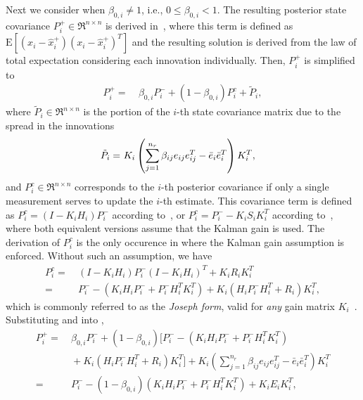 Next we consider when $\beta_{0,i}\neq1$, i.e., $0\leq\beta_{0,i}<1$.
The resulting posterior state covariance $P^+_{i}\in\Re^{n\times n}$ is derived in~\cite[Eq. D-32 and D-33]{TrackDataAssoc}, where this term is defined as $\text{E}[(x_i-\hat x_i^+)(x_i-\hat x_i^+)^T]$ and the resulting solution is derived from the law of total expectation considering each innovation individually. Then, $P^+_{i}$ is simplified to
\begin{align}
\label{eqn:JPDAFCov}
P^+_{i}=&\ \beta_{0,i}P^-_{i}+(1-\beta_{0,i})P_i^c+\tilde P_i,
\end{align}
where $\tilde P_i\in\Re^{n\times n}$ is the portion of the $i$-th state covariance matrix due to the spread in the innovations
\begin{align}
\tilde P_i=&\ K_i\left( {\sum_{j=1}^{n_r} \beta_{ij}e_{ij}e_{ij}^T-{\bar{e}}_{i}}{\bar{e}}_{i}^T \right)K_{i}^T,\label{eqn:tildeP}
\end{align}
and $P_i^c\in\Re^{n\times n}$ corresponds to the $i$-th posterior covariance if only a single measurement serves to update the $i$-th estimate.
This covariance term is defined as $P^c_i=(I-K_iH_i)P_i^-$ according to~\cite[Eq. D-27]{TrackDataAssoc}, or $P^c_i=P_i^--K_iS_iK_i^T$ according to~\cite[Eq. 43]{JPDAF1}, where both equivalent versions assume that the Kalman gain is used. The derivation of $P^c_i$ is the only occurence in  where the Kalman gain assumption is enforced. Without such an assumption, we have%
\begin{align}
P^c_i=&\ (I-K_iH_i)P^-_i(I-K_iH_i)^T+K_iR_iK_i^T\nonumber
\\
=&\ P^-_i-(K_iH_iP^-_i+P^-_iH_i^TK_i^T)+K_i(H_iP^-_iH_i^T+R_i)K_i^T,
\label{eqn:GenCov}
\end{align}
which is commonly referred to as the \emph{Joseph form}, valid for \emph{any} gain matrix $K_i$~\cite{OptEst1}.
Substituting  and  into ,%
\begin{align}
P^+_{i}=&\ \beta_{0,i}P^-_{i}+(1-\beta_{0,i})[P^-_i-(K_iH_iP^-_i+P^-_iH_i^TK_i^T)\nonumber
\\
&\ +K_i(H_iP^-_iH_i^T+R_i)K_i^T]+K_i\left({\sum_{j=1}^{n_r} \beta_{ij}e_{ij}e_{ij}^T-{\bar{e}}_{i}}{\bar{e}}_{i}^T\right)K_{i}^T\nonumber
\\
=&\ P^-_{i}-(1-\beta_{0,i})(K_iH_iP^-_i+P^-_iH_i^TK_i^T)+K_iE_iK_i^T,\label{eqn:CovExpanded}
\end{align}
